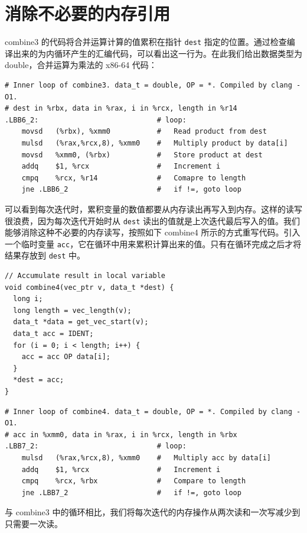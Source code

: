 \section{消除不必要的内存引用}

combine3 的代码将合并运算计算的值累积在指针 \verb|dest| 指定的位置。通过检查编译出来的为内循环产生的汇编代码，可以看出这一行为。在此我们给出数据类型为 double，合并运算为乘法的 x86-64 代码：

\begin{verbatim}
# Inner loop of combine3. data_t = double, OP = *. Compiled by clang -O1.
# dest in %rbx, data in %rax, i in %rcx, length in %r14
.LBB6_2:                            # loop:
    movsd   (%rbx), %xmm0           #   Read product from dest
    mulsd   (%rax,%rcx,8), %xmm0    #   Multiply product by data[i]
    movsd   %xmm0, (%rbx)           #   Store product at dest
    addq    $1, %rcx                #   Increment i
    cmpq    %rcx, %r14              #   Comapre to length
    jne .LBB6_2                     #   if !=, goto loop
\end{verbatim}

可以看到每次迭代时，累积变量的数值都要从内存读出再写入到内存。这样的读写很浪费，因为每次迭代开始时从 \verb|dest| 读出的值就是上次迭代最后写入的值。我们能够消除这种不必要的内存读写，按照如下 combine4 所示的方式重写代码。引入一个临时变量 \verb|acc|，它在循环中用来累积计算出来的值。只有在循环完成之后才将结果存放到 \verb|dest| 中。

\begin{verbatim}
// Accumulate result in local variable
void combine4(vec_ptr v, data_t *dest) {
  long i;
  long length = vec_length(v);
  data_t *data = get_vec_start(v);
  data_t acc = IDENT;
  for (i = 0; i < length; i++) {
    acc = acc OP data[i];
  }
  *dest = acc;
}
\end{verbatim}

\begin{verbatim}
# Inner loop of combine4. data_t = double, OP = *. Compiled by clang -O1.
# acc in %xmm0, data in %rax, i in %rcx, length in %rbx
.LBB7_2:                            # loop:
    mulsd   (%rax,%rcx,8), %xmm0    #   Multiply acc by data[i]
    addq    $1, %rcx                #   Increment i
    cmpq    %rcx, %rbx              #   Compare to length
    jne .LBB7_2                     #   if !=, goto loop
\end{verbatim}

与 combine3 中的循环相比，我们将每次迭代的内存操作从两次读和一次写减少到只需要一次读。

